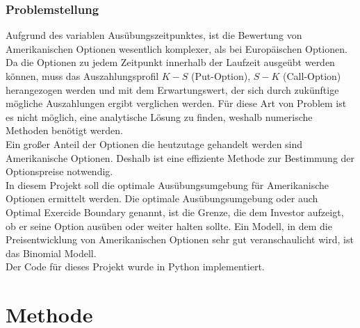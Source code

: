 \documentclass[12pt,a4paper]{article}
\begin{document}
\begin{text}
\section{Problemstellung}
Aufgrund des variablen Ausübungszeitpunktes, ist die Bewertung von Amerikanischen Optionen wesentlich komplexer, als bei Europäischen Optionen. Da die Optionen zu jedem Zeitpunkt innerhalb der Laufzeit ausgeübt werden können, muss das Auszahlungsprofil $K-S$ (Put-Option), $S-K$ (Call-Option) herangezogen werden und mit dem Erwartungswert, der sich durch zukünftige mögliche Auszahlungen ergibt verglichen werden. Für diese Art von Problem ist es nicht möglich, eine analytische Lösung zu finden, weshalb numerische Methoden benötigt werden.
\\[0.3 cm]
Ein großer Anteil der Optionen die heutzutage gehandelt werden sind Amerikanische Optionen. Deshalb ist eine effiziente Methode zur Bestimmung der Optionspreise notwendig.
\\[0.3 cm]
In diesem Projekt soll die optimale Ausübungsumgebung für Amerikanische Optionen ermittelt werden. Die optimale Ausübungsumgebung oder auch Optimal Exercide Boundary genannt, ist die Grenze, die dem Investor aufzeigt, ob er seine Option ausüben oder weiter halten sollte. Ein Modell, in dem die Preisentwicklung von Amerikanischen Optionen sehr gut veranschaulicht wird, ist das Binomial Modell.
\\[0.3 cm]
Der Code für dieses Projekt wurde in Python implementiert.

\newpage
\part{\centering Methode}

\end{text}
\end{document}
